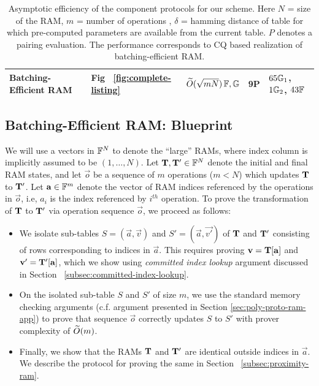 \begin{table}[bt]
\begin{tabular}{l|l|l|l|l}
        \rowcolor{lightgray}
        {Batching-Efficient RAM}                                                                          & {Fig  ~\ref{fig:complete-listing}}    & {$\widetilde{O}(\sqrt{mN})\,\mathbb{F},\mathbb{G}$}            & {9P}            & {$65\mathbb{G}_1$, $1\mathbb{G}_2$, $43\mathbb{F}$}  \\ \hline
    \end{tabular}
    \caption{Asymptotic efficiency of the component protocols for our scheme. Here $N$ = size of the RAM, $m$ = number of operations
    , $\delta$ = hamming distance of table for which pre-computed parameters are available from the current table.
    $P$ denotes a pairing evaluation. The performance corresponds to CQ based realization of batching-efficient
    RAM.}
    \label{tbl:efficiency-components}
    \vspace*{-5mm}
\end{table}



\subsection{Batching-Efficient RAM: Blueprint}\label{subsec:batching-efficient-ram-blueprint}
We will use a vectors in $\mathbb{F}^N$ to denote the ``large'' RAMs, where index column is implicitly
assumed to be $(1,\ldots,N)$.
Let $\mathbf{T},\mathbf{T'}\in \mathbb{F}^N$ denote the initial and final RAM states, and let $\vec{o}$ be
a sequence of $m$ operations ($m < N$) which updates $\mathbf{T}$ to $\mathbf{T}'$. Let $\mathbf{a}\in \mathbb{F}^m$ denote the vector
of RAM indices referenced by the operations in $\vec{o}$, i.e, $a_i$ is the index referenced by $i^{th}$ operation.
To prove the transformation of $\mathbf{T}$ to $\mathbf{T}'$ via operation sequence $\vec{o}$, we proceed as follows:
\begin{itemize}[leftmargin=1em, label=-]
    \item We isolate sub-tables $S=(\vec{a},\vec{v})$ and $S'=(\vec{a},\vec{v'})$ of $\mathbf{T}$ and $\mathbf{T}'$ consisting of
    rows corresponding to indices in $\vec{a}$. This requires proving $\mathbf{v}=\mathbf{T}[\mathbf{a}]$ and $\mathbf{v'}=
    \mathbf{T}'[\mathbf{a}]$, which we show using {\em committed index lookup} argument discussed in Section ~\ref{subsec:committed-index-lookup}.

    \item On the isolated sub-table $S$ and $S'$ of size $m$, we use the standard memory checking arguments (c.f. argument
    presented in Section \ref{sec:poly-proto-ram-app}) to prove that sequence $\vec{o}$ correctly updates $S$ to $S'$ with
    prover complexity of $\widetilde{O}(m)$.

    \item Finally, we show that the RAMs $\mathbf{T}$ and $\mathbf{T}'$ are identical outside indices in $\vec{a}$. We describe the protocol
    for proving the same in Section ~\ref{subsec:proximity-ram}.
\end{itemize}

